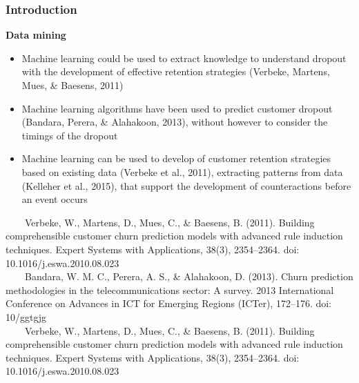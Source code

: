 \documentclass[10pt]{beamer}
\begin{document}
\begin{frame}
	\frametitle{Introduction}
	\Large
	\textbf{Data mining}\\
		\begin{itemize} \normalsize
			\item Machine learning could be used to extract knowledge to understand dropout with the development of effective retention strategies \footnotesize(Verbeke, Martens, Mues, \& Baesens, 2011)\normalsize
			\item Machine learning algorithms have been used to predict customer dropout \footnotesize(Bandara, Perera, \& Alahakoon, 2013)\normalsize, without however to consider the timings of the dropout
			\item Machine learning can be used to develop of customer retention strategies based on existing data \footnotesize(Verbeke et al., 2011)\normalsize, extracting patterns from data \footnotesize(Kelleher et al., 2015)\normalsize, that support the development of counteractions before an event occurs
		\end{itemize}	
	\tiny
	~~~~Verbeke, W., Martens, D., Mues, C., \& Baesens, B. (2011). Building comprehensible customer churn prediction models with advanced rule induction techniques. Expert Systems with Applications, 38(3), 2354–2364. doi: 10.1016/j.eswa.2010.08.023 \\
	~~~~Bandara, W. M. C., Perera, A. S., \& Alahakoon, D. (2013). Churn prediction methodologies in the telecommunications sector: A survey. 2013 International Conference on Advances in ICT for Emerging Regions (ICTer), 172–176. doi: 10/ggtgjg\\
	~~~~Verbeke, W., Martens, D., Mues, C., \& Baesens, B. (2011). Building comprehensible customer churn prediction models with advanced rule induction techniques. Expert Systems with Applications, 38(3), 2354–2364. doi: 10.1016/j.eswa.2010.08.023\\
\end{frame}
\end{document}
